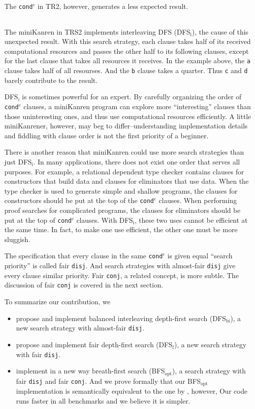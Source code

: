 \documentclass[format=acmlarge, review=true, authordraft=true]{acmart}
\newcommand{\conde}{\texttt{cond$^e$}}
\newcommand{\conj}{\texttt{conj}}
\newcommand{\disj}{\texttt{disj}}
\newcommand{\clisting}[1]{
\begin{center}
  \begin{tabular}{c}
	
    \end{tabular}
\end{center}
}
\newcommand{\DFSi }[0]{DFS$_\textrm{i}$}
\newcommand{\DFSf }[0]{DFS$_\textrm{f}$}
\newcommand{\DFSbi}[0]{DFS$_\textrm{bi}$}
\newcommand{\BFSopt}[0]{BFS$_\textrm{opt}$}
\begin{document}
The \conde{} in TR2, however, generates a less expected result.

\clisting{Figures/run-repeato-idfs.rkt}

The miniKanren in TRS2 implements interleaving DFS (\DFSi), the cause of this 
unexpected result. With this search strategy, each clause takes half 
of its received computational resources and passes the other half to its 
following clauses, except for the last clause that takes all resources it 
receives. In the example above, the \texttt{a} clause takes half of all 
resourses. And the \texttt{b} clause takes a quarter. Thus \texttt{c} and 
\texttt{d} barely contribute to the result.


\DFSi{} is sometimes powerful for an expert. By carefully organizing the order 
of \conde{} clauses, a miniKanren program can explore more ``interesting'' 
clauses than those uninteresting ones, and thus use computational resources 
efficiently. A little miniKanrener, however, may beg to differ--understanding
implementation details and fiddling with clause order is not the first
priority of a beginner.

There is another reason that miniKanren could use more search strategies than
just \DFSi. In many applications, there does not exist one order that serves all purposes. For example, a relational dependent type checker contains
clauses for constructors that build data and clauses for eliminators that use
data. When the type checker is used to generate simple and shallow programs,
the clauses for constructors should be put at the top of the
\conde{} clauses.
When performing proof searches for complicated programs, the clauses for 
eliminators should be put at the top of \conde{} clauses. With \DFSi, these two uses cannot be 
efficient at the same time. In fact, to make one use efficient, the other one 
must be more sluggish.

The specification that every clause in the same \conde{} is given equal 
``search priority'' is called fair \disj{}. And search strategies with 
almost-fair \disj{} give every clause similar priority. 
Fair \conj{}, a related concept, is more subtle. The discussion of fair
\conj{} is covered in the next section.

To summarize our contribution, we
\begin{itemize}
	\item propose and implement balanced interleaving depth-first search 
	(\DFSbi{}), a new search strategy with almost-fair \disj{}.
	\item propose and implement fair depth-first search (\DFSf{}), a 
	new search strategy with fair \disj{}.
	\item implement in a new way breath-first search (\BFSopt), 
        a search strategy 
	with fair \disj{} and fair \conj{}. And we prove formally that our 
\BFSopt{} implementation is semantically equivalent to the one 
by \citet{seres1999algebra}, however, Our code 
runs faster in all benchmarks and we believe it is simpler.
\end{itemize}
\end{document}
